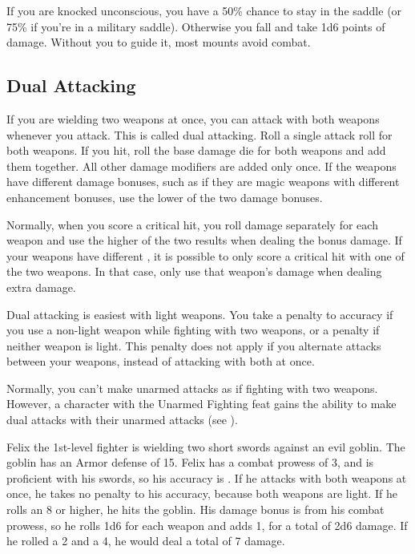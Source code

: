          If you are knocked unconscious, you have a 50\% chance to stay in the saddle (or 75\% if you're in a military saddle). Otherwise you fall and take 1d6 points of damage. Without you to guide it, most mounts avoid combat.

    \subsection{Dual Attacking}\label{Dual Attacking}
        If you are wielding two weapons at once, you can attack with both weapons whenever you attack. This is called dual attacking. Roll a single attack roll for both weapons. If you hit, roll the base damage die for both weapons and add them together. All other damage modifiers are added only once. If the weapons have different damage bonuses, such as if they are magic weapons with different enhancement bonuses, use the lower of the two damage bonuses.

         Normally, when you score a critical hit, you roll damage separately for each weapon and use the higher of the two results when dealing the bonus damage. If your weapons have different , it is possible to only score a critical hit with one of the two weapons. In that case, only use that weapon's damage when dealing extra damage.

         Dual attacking is easiest with light weapons. You take a  penalty to accuracy if you use a non-light weapon while fighting with two weapons, or a  penalty if neither weapon is light. This penalty does not apply if you alternate attacks between your weapons, instead of attacking with both at once.

         Normally, you can't make unarmed attacks as if fighting with two weapons. However, a character with the Unarmed Fighting feat gains the ability to make dual attacks with their unarmed attacks (see ).

         Felix the 1st-level fighter is wielding two short swords against an evil goblin. The goblin has an Armor defense of 15. Felix has a combat prowess of 3, and is proficient with his swords, so his accuracy is . If he attacks with both weapons at once, he takes no penalty to his accuracy, because both weapons are light. If he rolls an 8 or higher, he hits the goblin. His damage bonus is  from his combat prowess, so he rolls 1d6 for each weapon and adds 1, for a total of 2d6 damage. If he rolled a 2 and a 4, he would deal a total of 7 damage.


